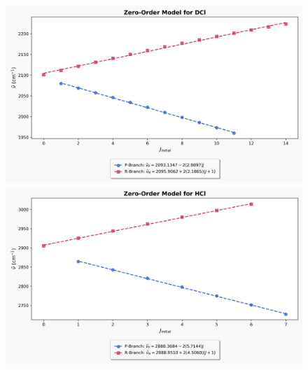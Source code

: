 \documentclass[titlepage]{article}
\begin{document}
\begin{figure}[htbp]
    \begin{minipage}[t]{\textwidth}
        \centering
        \includegraphics[width=\linewidth]{example-analysis/dcl-zero-order-fit.png}
    \end{minipage}
\caption*{\mbox{}}
\begin{minipage}[t]{\textwidth}
        \centering
        \includegraphics[width=\linewidth]{example-analysis/hcl-zero-order-fit.png}
    \end{minipage}
\end{figure}
\end{document}
